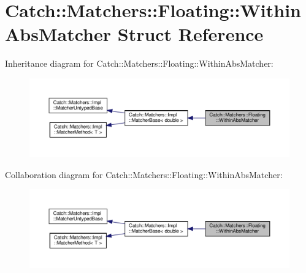 \hypertarget{structCatch_1_1Matchers_1_1Floating_1_1WithinAbsMatcher}{}\section{Catch\+::Matchers\+::Floating\+::Within\+Abs\+Matcher Struct Reference}
\label{structCatch_1_1Matchers_1_1Floating_1_1WithinAbsMatcher}


Inheritance diagram for Catch\+::Matchers\+::Floating\+::Within\+Abs\+Matcher\+:\nopagebreak
\begin{figure}[H]
\begin{center}
\leavevmode
\includegraphics[width=350pt]{structCatch_1_1Matchers_1_1Floating_1_1WithinAbsMatcher__inherit__graph}
\end{center}
\end{figure}


Collaboration diagram for Catch\+::Matchers\+::Floating\+::Within\+Abs\+Matcher\+:\nopagebreak
\begin{figure}[H]
\begin{center}
\leavevmode
\includegraphics[width=350pt]{structCatch_1_1Matchers_1_1Floating_1_1WithinAbsMatcher__coll__graph}
\end{center}
\end{figure}
